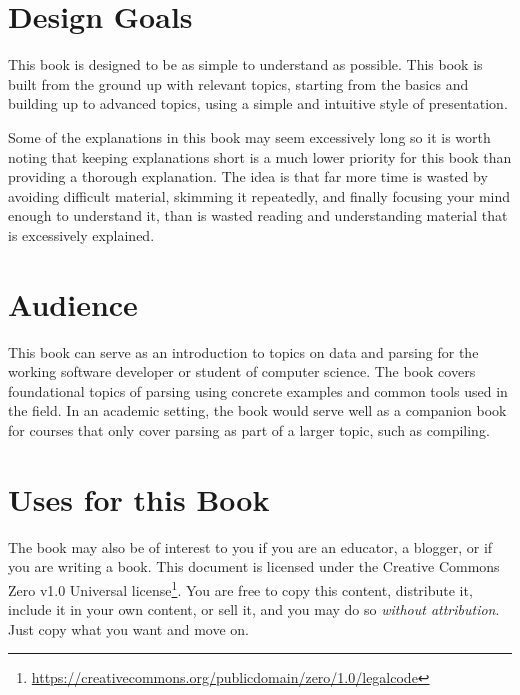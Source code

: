 \documentclass{book}
\begin{document}
\section*{Design Goals}
This book is designed to be as simple to understand as possible. 
This book is built from the ground up with relevant topics,
starting from the basics and building up to advanced topics, 
using a simple and intuitive style of presentation.

Some of the explanations in this book may seem excessively long so it is
worth noting that keeping explanations short is a much lower priority
for this book than providing a thorough explanation. The idea is that far
more time is wasted by avoiding difficult material, skimming it repeatedly,
and finally focusing your mind enough to understand it, than is wasted
reading and understanding material that is excessively explained.


\section*{Audience}
This book can serve as an introduction to topics on data and parsing for
the working software developer or student of computer science. The book
covers foundational topics of parsing using concrete examples and common
tools used in the field. In an academic setting, the book would serve well as
a companion book for courses that only cover parsing as part of a larger
topic, such as compiling.

\section*{Uses for this Book}
The book may also be of interest to you if you are an educator, a blogger,
or if you are writing a book. This document is licensed under the Creative
Commons Zero v1.0 Universal 
license\footnote{\url{https://creativecommons.org/publicdomain/zero/1.0/legalcode}}.
You are free to copy this content,
distribute it, include it in your own content, or sell it, and you may do so
\textit{without attribution}. Just copy what you want and move on.
\end{document}
